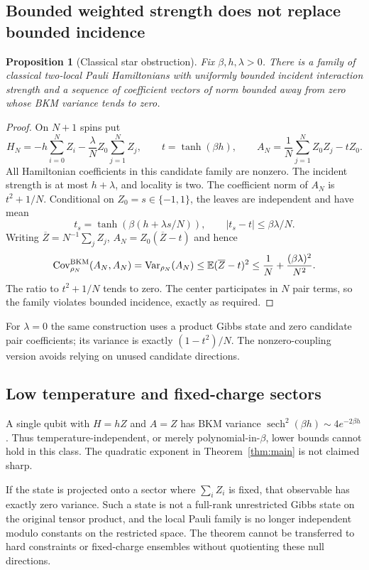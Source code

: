 \documentclass[11pt]{article}
\newtheorem{proposition}[theorem]{Proposition}
\theoremstyle{remark}\newtheorem{remark}[theorem]{Remark}
\begin{document}
\subsection{Bounded weighted strength does not replace bounded incidence}
\begin{proposition}[Classical star obstruction]\label{prop:star}
Fix $\beta,h,\lambda>0$. There is a family of classical two-local Pauli Hamiltonians with uniformly bounded incident interaction strength and a sequence of coefficient vectors of norm bounded away from zero whose BKM variance tends to zero.
\end{proposition}
\begin{proof}
On $N+1$ spins put
\[
 H_N=-h\sum_{i=0}^N Z_i-\frac\lambda N Z_0\sum_{j=1}^N Z_j,
 \qquad t=\tanh(\beta h),\qquad
 A_N=\frac1N\sum_{j=1}^N Z_0Z_j-tZ_0.
\]
All Hamiltonian coefficients in this candidate family are nonzero. The incident strength is at most $h+\lambda$, and locality is two. The coefficient norm of $A_N$ is $t^2+1/N$. Conditional on $Z_0=s\in\{-1,1\}$, the leaves are independent and have mean
\[
 t_s=\tanh(\beta(h+\lambda s/N)),\qquad |t_s-t|\le\beta\lambda/N.
\]
Writing $\overline Z=N^{-1}\sum_j Z_j$, $A_N=Z_0(\overline Z-t)$ and hence
\[
 \operatorname{Cov}^{\mathrm{BKM}}_{\rho_N}(A_N,A_N)=\operatorname{Var}_{\rho_N}(A_N)
 \le\mathbb E(\overline Z-t)^2
 \le\frac1N+\frac{(\beta\lambda)^2}{N^2}.
\]
The ratio to $t^2+1/N$ tends to zero. The center participates in $N$ pair terms, so the family violates bounded incidence, exactly as required.
\end{proof}
For $\lambda=0$ the same construction uses a product Gibbs state and zero candidate pair coefficients; its variance is exactly $(1-t^2)/N$. The nonzero-coupling version avoids relying on unused candidate directions.

\subsection{Low temperature and fixed-charge sectors}
A single qubit with $H=hZ$ and $A=Z$ has BKM variance $\operatorname{sech}^2(\beta h)\sim4e^{-2\beta h}$. Thus temperature-independent, or merely polynomial-in-$\beta$, lower bounds cannot hold in this class. The quadratic exponent in Theorem~\ref{thm:main} is not claimed sharp.

If the state is projected onto a sector where $\sum_i Z_i$ is fixed, that observable has exactly zero variance. Such a state is not a full-rank unrestricted Gibbs state on the original tensor product, and the local Pauli family is no longer independent modulo constants on the restricted space. The theorem cannot be transferred to hard constraints or fixed-charge ensembles without quotienting these null directions.
\end{document}
